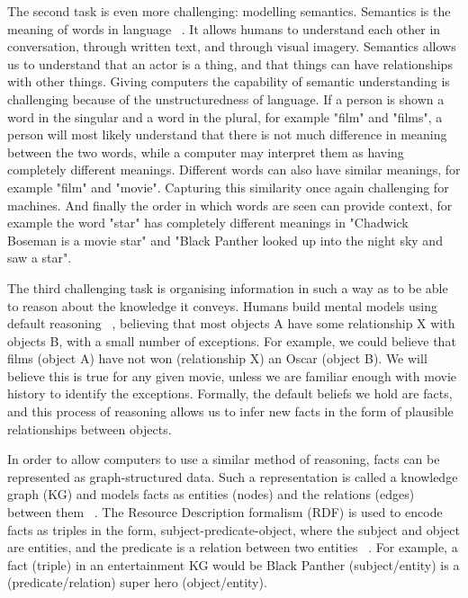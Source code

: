\noindent The second task is even more challenging: modelling semantics. Semantics is the meaning of words in language \unskip~\citep{chomsky1955logical}. It allows humans to understand each other in conversation, through written text, and through visual imagery. Semantics allows us to understand that an actor is a thing, and that things can have relationships with other things. Giving computers the capability of semantic understanding is challenging because of the unstructuredness of language. If a person is shown a word in the singular and a word in the plural, for example "film" and "films", a person will most likely understand that there is not much difference in meaning between the two words, while a computer may interpret them as having completely different meanings. Different words can also have similar meanings, for example "film" and "movie". Capturing this similarity once again challenging for machines. And finally the order in which words are seen can provide context, for example the word "star" has completely different meanings in "Chadwick Boseman is a movie star" and "Black Panther looked up into the night sky and saw a star". \par

\noindent The third challenging task is organising information in such a way as to be able to reason about the knowledge it conveys. Humans build mental models using default reasoning \unskip~\citep{reiter1980logic}, believing that most objects A have some relationship X with objects B, with a small number of exceptions. For example, we could believe that films (object A) have not won (relationship X) an Oscar (object B). We will believe this is true for any given movie, unless we are familiar enough with movie history to identify the exceptions. Formally, the default beliefs we hold are facts, and this process of reasoning allows us to infer new facts in the form of plausible relationships between objects. \par

\noindent In order to allow computers to use a similar method of reasoning, facts can be represented as graph-structured data. Such a representation is called a knowledge graph (KG) and models facts as entities (nodes) and the relations (edges) between them \unskip~\citep{nickel2015review}. The Resource Description formalism (RDF) is used to encode facts as triples in the form, subject-predicate-object, where the subject and object are entities, and the predicate is a relation between two entities \unskip~\citep{bizer2009dbpedia}. For example, a fact (triple) in an entertainment KG would be Black Panther (subject/entity) is a (predicate/relation) super hero (object/entity). \par


